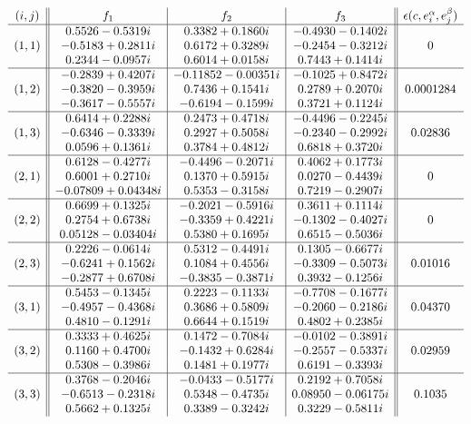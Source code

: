 \begin{widetext}
\begin{table}
\caption{Optimal bases for $\alpha=2,\beta=3$}\label{tbl:third}
\footnotesize
\[
\begin{array}{c||c|c|c||c}
(i,j) & f_1 & f_2 & f_3 & \epsilon(c,e^\alpha_i,e^\beta_j) \\
\hline
& 0.5526-0.5319 i & 0.3382+0.1860 i & -0.4930-0.1402 i \\
 (1,1) & -0.5183+0.2811 i & 0.6172+0.3289 i & -0.2454-0.3212 i &0 \\
& 0.2344-0.0957 i & 0.6014+0.0158 i & 0.7443+0.1414 i \\
 \hline
 &-0.2839+0.4207 i & -0.11852-0.00351 i & -0.1025+0.8472 i \\
 (1,2) & -0.3820-0.3959 i & 0.7436+0.1541 i & 0.2789+0.2070 i &0.0001284 \\
& -0.3617-0.5557 i & -0.6194-0.1599 i & 0.3721+0.1124 i \\
 \hline
& 0.6414+0.2288 i & 0.2473+0.4718 i & -0.4496-0.2245 i \\
 (1,3) & -0.6346-0.3339 i & 0.2927+0.5058 i & -0.2340-0.2992 i & 0.02836 \\
& 0.0596+0.1361 i & 0.3784+0.4812 i & 0.6818+0.3720 i \\
\hline
& 0.6128-0.4277 i & -0.4496-0.2071 i & 0.4062+0.1773 i \\
 (2,1) & 0.6001+0.2710 i & 0.1370+0.5915 i & 0.0270-0.4439 i & 0\\
&  -0.07809+0.04348 i & 0.5353-0.3158 i & 0.7219-0.2907 i \\
\hline
& 0.6699+0.1325 i & -0.2021-0.5916 i & 0.3611+0.1114 i \\
 (2,2) & 0.2754+0.6738 i & -0.3359+0.4221 i & -0.1302-0.4027 i & 0\\
 & 0.05128-0.03404 i & 0.5380+0.1695 i & 0.6515-0.5036 i \\
\hline
& 0.2226-0.0614 i & 0.5312-0.4491 i & 0.1305-0.6677 i \\
 (2,3) & -0.6241+0.1562 i & 0.1084+0.4556 i & -0.3309-0.5073 i & 0.01016 \\
& -0.2877+0.6708 i & -0.3835-0.3871 i & 0.3932-0.1256 i \\
\hline
& 0.5453-0.1345 i & 0.2223-0.1133 i & -0.7708-0.1677 i \\
 (3,1) & -0.4957-0.4368 i & 0.3686+0.5809 i & -0.2060-0.2186 i & 0.04370\\
 & 0.4810-0.1291 i & 0.6644+0.1519 i & 0.4802+0.2385 i \\
\hline
& 0.3333+0.4625 i & 0.1472-0.7084 i & -0.0102-0.3891 i \\
 (3,2) & 0.1160+0.4700 i & -0.1432+0.6284 i & -0.2557-0.5337 i & 0.02959\\
&  0.5308-0.3986 i & 0.1481+0.1977 i & 0.6191-0.3393 i \\
\hline
& 0.3768-0.2046 i & -0.0433-0.5177 i & 0.2192+0.7058 i \\
 (3,3) & -0.6513-0.2318 i & 0.5348-0.4735 i & 0.08950-0.06175 i & 0.1035 \\
& 0.5662+0.1325 i & 0.3389-0.3242 i & 0.3229-0.5811 i \\
\end{array}
\]
\end{table}


\end{widetext}